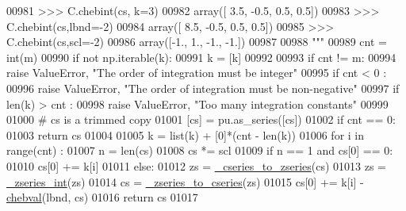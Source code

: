 \begin{DoxyCode}
00981 \textcolor{stringliteral}{    >>> C.chebint(cs, k=3)}
00982 \textcolor{stringliteral}{    array([ 3.5, -0.5,  0.5,  0.5])}
00983 \textcolor{stringliteral}{    >>> C.chebint(cs,lbnd=-2)}
00984 \textcolor{stringliteral}{    array([ 8.5, -0.5,  0.5,  0.5])}
00985 \textcolor{stringliteral}{    >>> C.chebint(cs,scl=-2)}
00986 \textcolor{stringliteral}{    array([-1.,  1., -1., -1.])}
00987 \textcolor{stringliteral}{}
00988 \textcolor{stringliteral}{    """}
00989     cnt = int(m)
00990     \textcolor{keywordflow}{if} \textcolor{keywordflow}{not} np.iterable(k):
00991         k = [k]
00992 
00993     \textcolor{keywordflow}{if} cnt != m:
00994         \textcolor{keywordflow}{raise} ValueError, \textcolor{stringliteral}{"The order of integration must be integer"}
00995     \textcolor{keywordflow}{if} cnt < 0 :
00996         \textcolor{keywordflow}{raise} ValueError, \textcolor{stringliteral}{"The order of integration must be non-negative"}
00997     \textcolor{keywordflow}{if} len(k) > cnt :
00998         \textcolor{keywordflow}{raise} ValueError, \textcolor{stringliteral}{"Too many integration constants"}
00999 
01000     \textcolor{comment}{# cs is a trimmed copy}
01001     [cs] = pu.as\_series([cs])
01002     \textcolor{keywordflow}{if} cnt == 0:
01003         \textcolor{keywordflow}{return} cs
01004 
01005     k = list(k) + [0]*(cnt - len(k))
01006     \textcolor{keywordflow}{for} i \textcolor{keywordflow}{in} range(cnt) :
01007         n = len(cs)
01008         cs *= scl
01009         \textcolor{keywordflow}{if} n == 1 \textcolor{keywordflow}{and} cs[0] == 0:
01010             cs[0] += k[i]
01011         \textcolor{keywordflow}{else}:
01012             zs = \hyperlink{namespacepyneb_1_1utils_1_1chebyshev_a659e346f7cdd9fd058850b26f7e95b17}{\_cseries\_to\_zseries}(cs)
01013             zs = \hyperlink{namespacepyneb_1_1utils_1_1chebyshev_a39d3ae73408fcde399d87f5cfd5e7c98}{\_zseries\_int}(zs)
01014             cs = \hyperlink{namespacepyneb_1_1utils_1_1chebyshev_a2a88474ce0ea12fb26f82b7116752dc1}{\_zseries\_to\_cseries}(zs)
01015             cs[0] += k[i] - \hyperlink{namespacepyneb_1_1utils_1_1chebyshev_a7f7442e9a3a00e1ca04a2283877b15a8}{chebval}(lbnd, cs)
01016     \textcolor{keywordflow}{return} cs
01017 
\end{DoxyCode}
\hypertarget{namespacepyneb_1_1utils_1_1chebyshev_ad14ae6340a5a9e3c93c1bb720f4e5a04}{}
